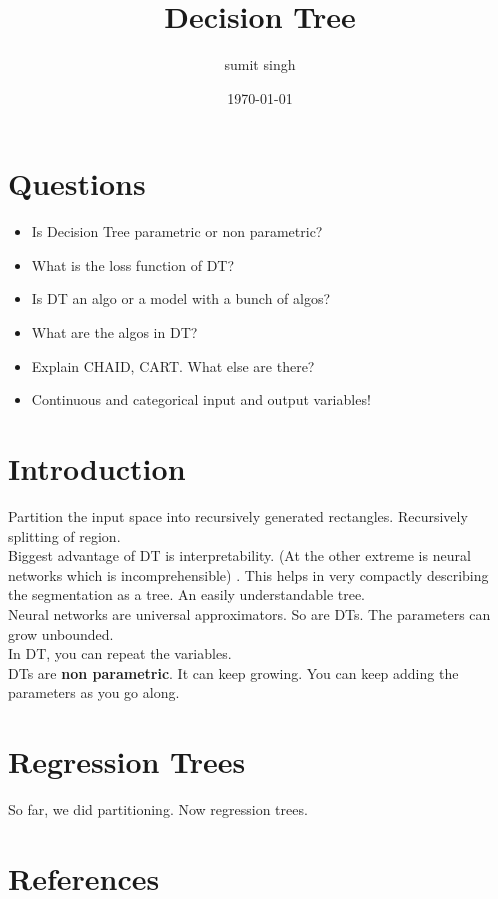 \documentclass{article}
\title{Decision Tree}
\author{sumit singh}
\date{\today}
\begin{document}
\maketitle

\section{Questions}
\begin{itemize}
    \item Is Decision Tree parametric or non parametric?
    \item What is the loss function of DT?
    \item Is DT an algo or a model with a bunch of algos?
    \item What are the algos in DT?
    \item Explain CHAID, CART. What else are there?
    \item Continuous and categorical input and output variables!
\end{itemize}
\section{Introduction}
Partition the input space into recursively generated rectangles. Recursively splitting of region. \\
Biggest advantage of DT is interpretability. (At the other extreme is neural networks which is incomprehensible) . This helps in very compactly describing  the segmentation as a tree. An easily understandable tree. \\
Neural networks are universal approximators. So are DTs. The parameters can grow unbounded. \\
In DT, you can repeat the variables. \\
DTs are \textbf{non parametric}. It can keep growing. You can keep adding the parameters as you go along. \\
\section{Regression Trees}
So far, we did partitioning. Now regression trees.\\
\section{References}
\end{document}
